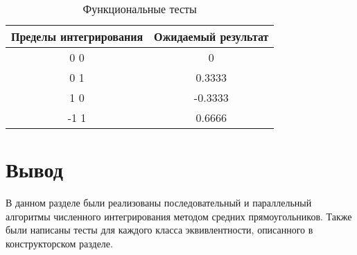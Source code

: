 \begin{table}[h!]
	\begin{center}
    \begin{threeparttable}
        \captionsetup{justification=raggedright,singlelinecheck=off}
        \caption{\label{tab:tests}Функциональные тесты}
        \begin{tabular}{|c|c|}
			\hline
            \textbf{Пределы интегрирования} & \textbf{Ожидаемый результат} \\ [2mm]
            \hline
            0 0
            &
            0
            \\
            \hline
            0 1
            &
            0.3333
            \\
            \hline
            1 0
            &
            -0.3333
            \\
            \hline
            -1 1
            &
            0.6666
            \\
            \hline
		\end{tabular}
    \end{threeparttable} 
	\end{center}
\end{table}

\section{Вывод}

В данном разделе были реализованы последовательный и параллельный алгоритмы
численного интегрирования методом средних прямоугольников. Также были написаны
тесты для каждого класса эквивлентности, описанного в конструкторском разделе.
